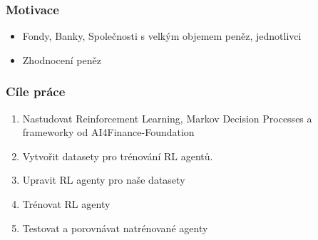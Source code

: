 




\begin{frame}
    \frametitle{Motivace}
    \begin{itemize}
        \itemsep1em
        \item Fondy, Banky, Společnosti s velkým objemem peněz, jednotlivci
        \item Zhodnocení peněz
    \end{itemize}
\end{frame}

\begin{frame}
    \frametitle{Cíle práce}
    \begin{enumerate}
        \itemsep1em
        \item Nastudovat Reinforcement Learning, Markov Decision Processes a frameworky od AI4Finance-Foundation
        \item Vytvořit datasety pro trénování RL agentů.
        \item Upravit RL agenty pro naše datasety
        \item Trénovat RL agenty
        \item Testovat a porovnávat natrénované agenty
    \end{enumerate}
\end{frame}

